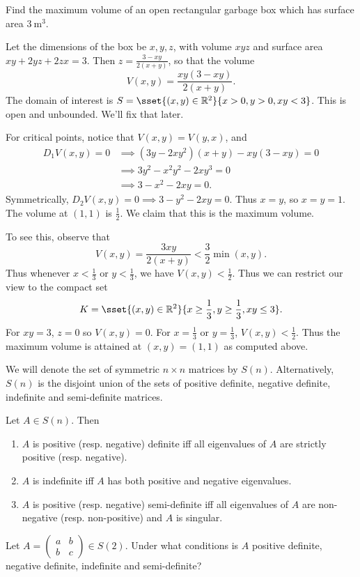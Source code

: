 
\begin{examples}
    \item Find the maximum volume of an open rectangular garbage box which
    has surface area $\SI{3}{\meter^3}$.

    Let the dimensions of the box be $x, y, z$,
    with volume $xyz$ and surface area $xy + 2yz + 2zx = 3$.
    Then $z = \frac{3 - xy}{2(x + y)}$, so that the volume \[
        V(x, y) = \frac{xy(3 - xy)}{2(x + y)}.
    \] The domain of interest is $S = \sset{(x, y) \in \R^2}
    {x > 0, y > 0, xy < 3}$.
    This is open and unbounded.
    We'll fix that later.

    For critical points, notice that $V(x, y) = V(y, x)$, and \begin{align*}
        D_1 V(x, y) = 0
            &\implies (3y - 2xy^2)(x + y) - xy(3 - xy) = 0 \\
            &\implies 3y^2 - x^2y^2 - 2xy^3 = 0 \\
            &\implies 3 - x^2 - 2xy = 0.
    \end{align*}
    Symmetrically, $D_2 V(x, y) = 0 \implies 3 - y^2 - 2xy = 0$.
    Thus $x = y$, so $x = y = 1$.
    The volume at $(1, 1)$ is $\frac12$.
    We claim that this is the maximum volume.

    To see this, observe that \[
        V(x,y) = \frac{3xy}{2(x+y)} < \frac32 \min(x, y).
    \] Thus whenever $x < \frac13$ or $y < \frac13$, we have
    $V(x, y) < \frac12$.
    Thus we can restrict our view to the compact set \[
        K = \sset{(x, y) \in \R^2}{x \ge \frac13, y \ge \frac13, xy \le 3}.
    \]
    For $xy = 3$, $z = 0$ so $V(x, y) = 0$.
    For $x = \frac13$ or $y = \frac13$, $V(x, y) < \frac12$.
    Thus the maximum volume is attained at $(x, y) = (1, 1)$ as computed
    above.
\end{examples}

\begin{definition}
    We will denote the set of symmetric $n \times n$ matrices by $S(n)$.
    Alternatively, $S(n)$ is the disjoint union of the sets of
    positive definite, negative definite, indefinite and semi-definite
    matrices.
\end{definition}
\begin{exercise*}
    Let $A \in S(n)$.
    Then
    \begin{enumerate}
        \item $A$ is positive (resp. negative) definite iff all eigenvalues
        of $A$ are strictly positive (resp. negative).
        \item $A$ is indefinite iff $A$ has both positive and negative
        eigenvalues.
        \item $A$ is positive (resp. negative) semi-definite iff all
        eigenvalues of $A$ are non-negative (resp. non-positive)
        and $A$ is singular.
    \end{enumerate}
\end{exercise*}

\begin{exercise*}
    Let $A = \begin{pmatrix}
        a & b \\
        b & c
    \end{pmatrix} \in S(2)$.
    Under what conditions is $A$ positive definite, negative definite,
    indefinite and semi-definite?
\end{exercise*}

